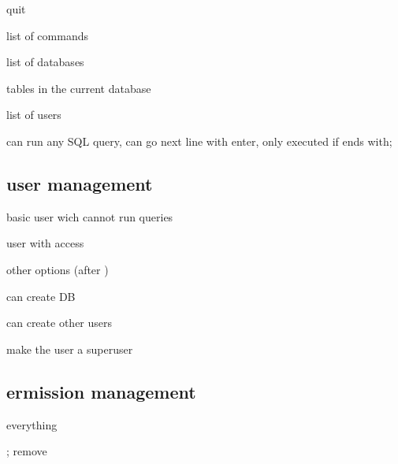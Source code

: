 		 quit

		 list of commands

		 list of databases

		 tables in the current database

		 list of users

		can run any SQL query, can go next line with enter, only executed if ends with;

	\subsection{user management}

		 basic user wich cannot run queries

		 user with access

		other options (after )

		 can create DB

		 can create other users

		 make the user a superuser

	\subsection{ermission management}

		
		 everything 

		; remove


